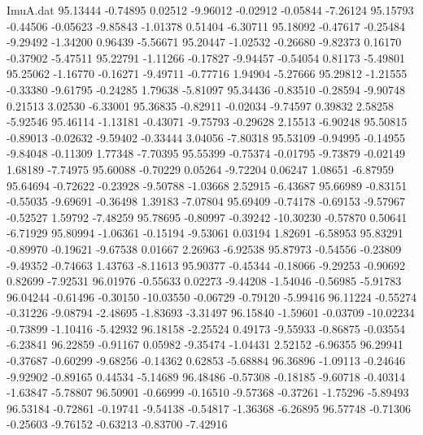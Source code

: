 \begin{filecontents}{ImuA.dat}
  95.13444   -0.74895    0.02512   -9.96012   -0.02912   -0.05844   -7.26124
  95.15793   -0.44506   -0.05623   -9.85843   -1.01378    0.51404   -6.30711
  95.18092   -0.47617   -0.25484   -9.29492   -1.34200    0.96439   -5.56671
  95.20447   -1.02532   -0.26680   -9.82373    0.16170   -0.37902   -5.47511
  95.22791   -1.11266   -0.17827   -9.94457   -0.54054    0.81173   -5.49801
  95.25062   -1.16770   -0.16271   -9.49711   -0.77716    1.94904   -5.27666
  95.29812   -1.21555   -0.33380   -9.61795   -0.24285    1.79638   -5.81097
  95.34436   -0.83510   -0.28594   -9.90748    0.21513    3.02530   -6.33001
  95.36835   -0.82911   -0.02034   -9.74597    0.39832    2.58258   -5.92546
  95.46114   -1.13181   -0.43071   -9.75793   -0.29628    2.15513   -6.90248
  95.50815   -0.89013   -0.02632   -9.59402   -0.33444    3.04056   -7.80318
  95.53109   -0.94995   -0.14955   -9.84048   -0.11309    1.77348   -7.70395
  95.55399   -0.75374   -0.01795   -9.73879   -0.02149    1.68189   -7.74975
  95.60088   -0.70229    0.05264   -9.72204    0.06247    1.08651   -6.87959
  95.64694   -0.72622   -0.23928   -9.50788   -1.03668    2.52915   -6.43687
  95.66989   -0.83151   -0.55035   -9.69691   -0.36498    1.39183   -7.07804
  95.69409   -0.74178   -0.69153   -9.57967   -0.52527    1.59792   -7.48259
  95.78695   -0.80997   -0.39242  -10.30230   -0.57870    0.50641   -6.71929
  95.80994   -1.06361   -0.15194   -9.53061    0.03194    1.82691   -6.58953
  95.83291   -0.89970   -0.19621   -9.67538    0.01667    2.26963   -6.92538
  95.87973   -0.54556   -0.23809   -9.49352   -0.74663    1.43763   -8.11613
  95.90377   -0.45344   -0.18066   -9.29253   -0.90692    0.82699   -7.92531
  96.01976   -0.55633    0.02273   -9.44208   -1.54046   -0.56985   -5.91783
  96.04244   -0.61496   -0.30150  -10.03550   -0.06729   -0.79120   -5.99416
  96.11224   -0.55274   -0.31226   -9.08794   -2.48695   -1.83693   -3.31497
  96.15840   -1.59601   -0.03709  -10.02234   -0.73899   -1.10416   -5.42932
  96.18158   -2.25524    0.49173   -9.55933   -0.86875   -0.03554   -6.23841
  96.22859   -0.91167    0.05982   -9.35474   -1.04431    2.52152   -6.96355
  96.29941   -0.37687   -0.60299   -9.68256   -0.14362    0.62853   -5.68884
  96.36896   -1.09113   -0.24646   -9.92902   -0.89165    0.44534   -5.14689
  96.48486   -0.57308   -0.18185   -9.60718   -0.40314   -1.63847   -5.78807
  96.50901   -0.66999   -0.16510   -9.57368   -0.37261   -1.75296   -5.89493
  96.53184   -0.72861   -0.19741   -9.54138   -0.54817   -1.36368   -6.26895
  96.57748   -0.71306   -0.25603   -9.76152   -0.63213   -0.83700   -7.42916

\end{filecontents}

